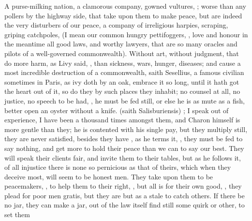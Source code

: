 A purse-milking nation, a clamorous company, gowned vultures, ; worse than any pollers by the highway side,  that take
upon them to make peace, but are indeed the very disturbers of our
peace, a company of irreligious harpies, scraping, griping catchpoles,
(I mean our common hungry pettifoggers, , love and
honour in the meantime all good laws, and worthy lawyers, that are so
many oracles and pilots of a well-governed commonwealth). Without
art, without judgment, that do more harm, as Livy said, , than sickness, wars, hunger, diseases; and
cause a most incredible destruction of a commonwealth, saith
Sesellius, a famous civilian sometimes in Paris, as ivy doth by an
oak, embrace it so long, until it hath got the heart out of it, so do
they by such places they inhabit; no counsel at all, no justice, no
speech to be had, , he must be fed still, or else
he is as mute as a fish, better open an oyster without a knife.  (saith  Salisburiensis) ; I
speak out of experience, I have been a thousand times amongst them, and
Charon himself is more gentle than they; he is contented with his
single pay, but they multiply still, they are never satisfied, besides
they have , as he terms it, , they must be fed to say nothing, and get more to hold
their peace than we can to say our best. They will speak their clients
fair, and invite them to their tables, but as he follows it, of
all injustice there is none so pernicious as that of theirs, which when
they deceive most, will seem to be honest men. They take upon them to
be peacemakers, , to help them to their right,
, but all is for their own good, , they plead for poor men gratis, but they are but
as a stale to catch others. If there be no jar, they can make a
jar, out of the law itself find still some quirk or other, to set them
